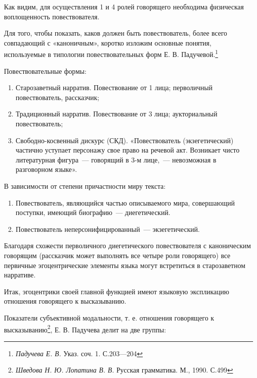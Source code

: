 \documentclass{kursa4}
\begin{document}
      \bigskip

      Как видим, для осуществления 1 и 4 ролей говорящего необходима
      физическая воплощенность повествователя. 

      Для того, чтобы показать, каков должен быть повествователь, более
      всего совпадающий с «каноничным», коротко изложим основные понятия,
      используемые в типологии повествовательных форм Е. В.
      Падучевой.\footnote{\textit{{ Падучева Е. В.
      }}{Указ. соч. 1. С.203—204}} \newline

      Повествовательные формы:
      \begin{enumerate}
        \item Старозаветный нарратив. Повествование от 1 лица; перволичный
        повествователь, рассказчик; 
        \item Традиционный нарратив. Повествование от 3 лица; аукториальный
        повествователь;
        \item Свободно-косвенный дискурс (СКД). «Повествователь (экзегетический)
        частично уступает персонажу свое право на речевой акт. Возникает чисто
        литературная фигура~--- говорящий в 3-м лице,~--- невозможная в разговорном
        языке».
      \end{enumerate}

      В зависимости от степени причастности миру текста:
      \begin{enumerate}
        \item Повествователь, являющийся частью описываемого мира,
        совершающий поступки, имеющий биографию~--- диегетический. 
        \item Повествователь неперсонифицированный~--- экзегетический. 
       \end{enumerate} 

      Благодаря схожести перволичного диегетического повествователя с
      каноническим говорящим (рассказчик может выполнять все четыре роли
      говорящего) все первичные эгоцентрические элементы языка могут
      встретиться в старозаветном нарративе. 

      Итак, эгоцентрики своей главной функцией имеют языковую экспликацию
      отношения говорящего к высказыванию. 

      Показатели субъективной модальности, т. е. отношения говорящего к
      высказыванию\footnote{\textit{{ Шведова Н. Ю. Лопатина
      В. В. }}{Русская грамматика. М., 1990. С.499}}, Е. В.
      Падучева делит на две группы: 
\end{document}
